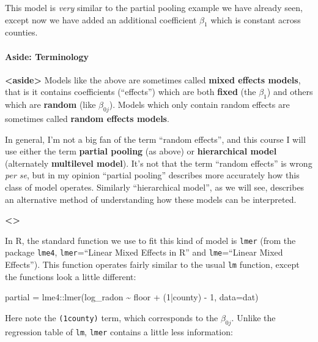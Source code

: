 \documentclass[
]{article}
\newenvironment{Shaded}{\begin{snugshade}}{\end{snugshade}}
\newcommand{\AttributeTok}[1]{\textcolor[rgb]{0.77,0.63,0.00}{#1}}
\newcommand{\DecValTok}[1]{\textcolor[rgb]{0.00,0.00,0.81}{#1}}
\newcommand{\FunctionTok}[1]{\textcolor[rgb]{0.00,0.00,0.00}{#1}}
\newcommand{\NormalTok}[1]{#1}
\newcommand{\OtherTok}[1]{\textcolor[rgb]{0.56,0.35,0.01}{#1}}
\newcommand{\SpecialCharTok}[1]{\textcolor[rgb]{0.00,0.00,0.00}{#1}}
\begin{document}
This model is \emph{very} similar to the partial pooling example we have
already seen, except now we have added an additional coefficient
\(\beta_1\) which is constant across counties.

\hypertarget{aside-terminology}{%
\paragraph{Aside: Terminology}\label{aside-terminology}}

\textbf{\textless aside\textgreater{}} Models like the above are
sometimes called \textbf{mixed effects models}, that is it contains
coefficients (``effects'') which are both \textbf{fixed} (the
\(\beta_1\)) and others which are \textbf{random} (like \(\beta_{0j}\)).
Models which only contain random effects are sometimes called
\textbf{random effects models}.

In general, I'm not a big fan of the term ``random effects'', and this
course I will use either the term \textbf{partial pooling} (as above) or
\textbf{hierarchical model} (alternately \textbf{multilevel model}).
It's not that the term ``random effects'' is wrong \emph{per se}, but in
my opinion ``partial pooling'' describes more accurately how this class
of model operates. Similarly ``hierarchical model'', as we will see,
describes an alternative method of understanding how these models can be
interpreted.

\textbf{\textless{}\aside\textgreater{}}

In R, the standard function we use to fit this kind of model is
\texttt{lmer} (from the package \texttt{lme4}, \texttt{lmer}=``Linear
Mixed Effects in R'' and \texttt{lme}=``Linear Mixed Effects''). This
function operates fairly similar to the usual \texttt{lm} function,
except the functions look a little different:

\begin{Shaded}
\begin{Highlighting}[]
\NormalTok{partial }\OtherTok{=}\NormalTok{ lme4}\SpecialCharTok{::}\FunctionTok{lmer}\NormalTok{(log\_radon }\SpecialCharTok{\textasciitilde{}}\NormalTok{ floor }\SpecialCharTok{+}\NormalTok{ (}\DecValTok{1}\SpecialCharTok{|}\NormalTok{county) }\SpecialCharTok{{-}} \DecValTok{1}\NormalTok{, }\AttributeTok{data=}\NormalTok{dat)}
\end{Highlighting}
\end{Shaded}

Here note the \texttt{(1\textbar{}county)} term, which corresponds to
the \(\beta_{0j}\). Unlike the regression table of \texttt{lm},
\texttt{lmer} contains a little less information:
\end{document}
